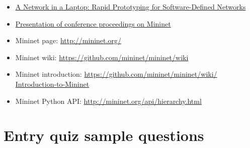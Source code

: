 \documentclass[a4paper]{article}
\begin{document}
\begin{itemize}
    \item \href{https://qosip.tmit.bme.hu/foswiki/pub/Meres/OpenFlowMScMeresiSegedlet/a19-lantz.pdf}{A Network in a
              Laptop: Rapid Prototyping for Software-Defined Networks}
    \item

          \href{https://qosip.tmit.bme.hu/foswiki/pub/Meres/OpenFlowMScMeresiSegedlet/mininet-hotnets2010-final.pdf}{Presentation
              of conference proceedings on Mininet}
    \item	Mininet page: \url{http://mininet.org/}
    \item	Mininet wiki: \url{https://github.com/mininet/mininet/wiki}
    \item	Mininet introduction: \url{https://github.com/mininet/mininet/wiki/  Introduction-to-Mininet}
    \item	Mininet Python API: \url{http://mininet.org/api/hierarchy.html}
\end{itemize}

\appendix

\section{Entry quiz sample questions}

\end{document}
